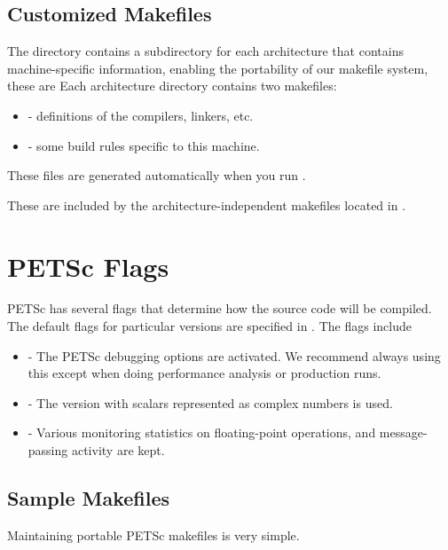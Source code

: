 {{\subsection{Customized Makefiles}
\label{sec_custom}

The directory  contains a subdirectory for each
architecture that contains machine-specific information, enabling the
portability of our makefile system, these are 
 Each architecture directory contains
two makefiles:
\begin{itemize}
\item {} - definitions of the compilers, linkers, etc.
\item {} - some build rules specific to this machine.
\end{itemize}
These files are generated automatically when you run .

These are included by the architecture-independent makefiles located in
.

\section{PETSc Flags}
\label{sec_makeflags}

PETSc has several flags that determine how the source code will be
compiled.  The default flags for particular versions are specified in
.
The flags include
\begin{itemize}
\item {} - The PETSc debugging options are activated. We
      recommend always using this except when doing performance analysis or production runs. 
\item {} - The version with scalars represented
      as complex numbers is used. 
\item {} - Various monitoring statistics on floating-point operations,
      and message-passing activity are kept. 
\end{itemize}

\subsection{Sample Makefiles}

Maintaining portable PETSc makefiles is very simple.

}}
